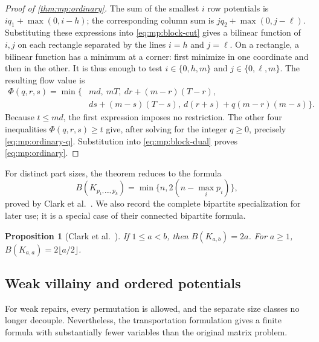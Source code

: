 \documentclass[11pt,reqno]{amsart}
\numberwithin{equation}{section}
\newtheorem{proposition}[theorem]{Proposition}
\theoremstyle{definition}
\theoremstyle{remark}
\begin{document}
\begin{proof}[Proof of \cref{thm:mp:ordinary}]
The sum of the smallest $i$ row potentials is
$iq_1+\max(0,i-h)$; the corresponding column sum is
$jq_2+\max(0,j-\ell)$. Substituting these expressions into
\eqref{eq:mp:block-cut} gives a bilinear function of $i,j$ on each
rectangle separated by the lines $i=h$ and $j=\ell$. On a rectangle,
a bilinear function has a minimum at a corner: first minimize in one
coordinate and then in the other. It is thus enough to test
$i\in\{0,h,m\}$ and $j\in\{0,\ell,m\}$. The resulting flow value is
\begin{equation}\label{eq:mp:balanced-flow}
\begin{split}
 \Phi(q,r,s)=\min\{&md,\ mT,\ dr+(m-r)(T-r),\\
                  &ds+(m-s)(T-s),\ d(r+s)+q(m-r)(m-s)\}.
\end{split}
\end{equation}
Because $t\le md$, the first expression imposes no restriction. The
other four inequalities $\Phi(q,r,s)\ge t$ give, after solving for the
integer $q\ge0$, precisely \eqref{eq:mp:ordinary-q}. Substitution into
\eqref{eq:mp:block-dual} proves \eqref{eq:mp:ordinary}.
\end{proof}

For distinct part sizes, the theorem reduces to the formula
\[
 B(K_{p_1,\ldots,p_k})=\min\{n,2(n-\max_i p_i)\},
\]
proved by Clark et al.~\cite[Proposition~4.1]{clark2006}. We also record
the complete bipartite specialization for later use; it is a special
case of their connected bipartite formula.

\begin{proposition}[Clark et al.~\cite{clark2006}]
\label{cor:mp:bipartite}
If $1\le a<b$, then $B(K_{a,b})=2a$. For $a\ge1$,
$B(K_{a,a})=2\lfloor a/2\rfloor$.
\end{proposition}

\subsection{Weak villainy and ordered potentials}

For weak repairs, every permutation is allowed, and the separate size
classes no longer decouple. Nevertheless, the transportation formulation
gives a finite formula with substantially fewer variables than the
original matrix problem.
\end{document}
